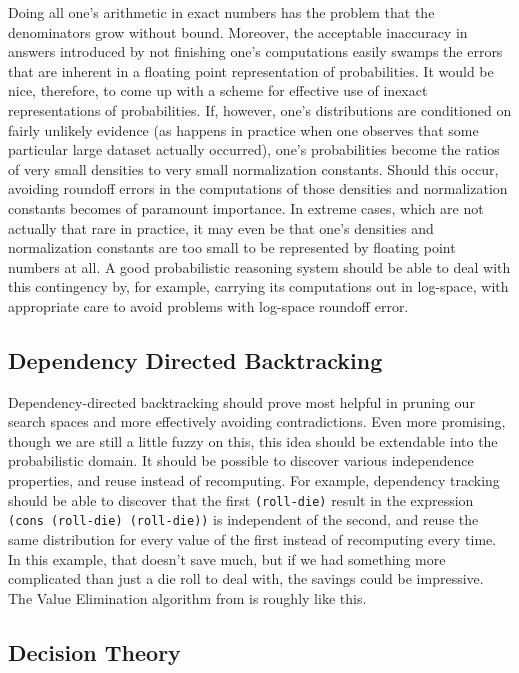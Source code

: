 \documentclass[12pt]{article}
\newcommand{\code}[1]{\texttt{#1}}
\begin{document}
Doing all one's arithmetic in exact numbers has the problem that the
denominators grow without bound.  Moreover, the acceptable inaccuracy
in answers introduced by not finishing one's computations easily
swamps the errors that are inherent in a floating point representation
of probabilities.  It would be nice, therefore, to come up with a
scheme for effective use of inexact representations of probabilities.
If, however, one's distributions are conditioned on fairly unlikely
evidence (as happens in practice when one observes that some
particular large dataset actually occurred), one's probabilities
become the ratios of very small densities to very small normalization
constants.  Should this occur, avoiding roundoff errors in the
computations of those densities and normalization constants becomes of
paramount importance.  In extreme cases, which are not actually that
rare in practice, it may even be
that one's densities and normalization constants are too small to be
represented by floating point numbers at all.  A good probabilistic
reasoning system should be able to deal with this contingency by, for
example, carrying its computations out in log-space, with appropriate
care to avoid problems with log-space roundoff error.

\subsection{Dependency Directed Backtracking}
\label{ddb}

Dependency-directed backtracking should prove most helpful in pruning
our search spaces and more effectively avoiding contradictions.  Even
more promising, though we are still a little fuzzy on this, this idea
should be extendable into the probabilistic domain.  It should be
possible to discover various independence properties, and reuse
instead of recomputing.  For example, dependency tracking should be
able to discover that the first \code{(roll-die)} result in the
expression \code{(cons (roll-die) (roll-die))} is independent of the
second, and reuse the same distribution for every value of the first
instead of recomputing every time.  In this example, that doesn't save
much, but if we had something more complicated than just a die roll to
deal with, the savings could be impressive.  The Value Elimination
algorithm from \cite{bacchus03value} is roughly like this.

\subsection{Decision Theory}
\label{decision}
\end{document}
